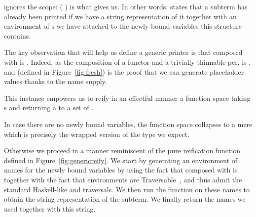 ignores the scope: ({ \AF{++} }) is what  gives us.
%
In other words:  states that a subterm has already been printed
if we have a string representation of it together with an environment of
s we have attached to the newly bound variables this structure
contains.
%
\begin{agdasnippet}
\end{agdasnippet}
%
The key observation that will help us define a generic printer is that
 composed with  is . Indeed, as the
composition of a functor and a trivially thinnable per,
 is , and  (defined in
Figure~\ref{fig:fresh}) is the proof that we can generate
placeholder values thanks to the name supply.

\begin{agdasnippet}
\end{agdasnippet}

This  instance empowers us to reify in an effectful manner
a  function space taking s and returning a 
to a set of .

\begin{agdasnippet}
\end{agdasnippet}

In case there are no newly bound variables, the  function space
collapses to a mere  which is precisely the wrapped version of
the type we expect.

\begin{agdasnippet}
\end{agdasnippet}

Otherwise we proceed in a manner reminiscent of the pure reification function
defined in Figure~\ref{fig:genericreify}. We start by generating an environment
of names for the newly bound variables by using the fact that  composed
with  is  together with the fact that environments are
Traversable~\cite{mcbride_paterson_2008}, %
and thus admit the standard Haskell-like  and 
traversals. %
We then run the  function
on these names to obtain the string representation of the subterm. We finally
return the names we used together with this string.

